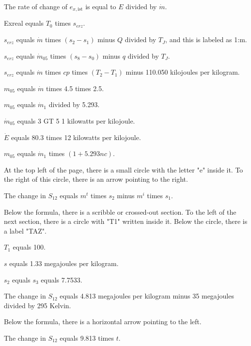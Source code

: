 The rate of change of \( e_{x, \text{ist}} \) is equal to \( E \) divided by \( \dot{m} \).

Exreal equals \( T_0 \) times \( s_{erz} \).

\( s_{erz} \) equals \( \dot{m} \) times \( (s_2 - s_1) \) minus \( Q \) divided by \( T_J \), and this is labeled as 1:m.

\( s_{erz} \) equals \( \dot{m}_{05} \) times \( (s_8 - s_0) \) minus \( q \) divided by \( T_J \).

\( s_{erz} \) equals \( \dot{m} \) times \( cp \) times \( (T_2 - T_1) \) minus 110.050 kilojoules per kilogram.

\( m_{05} \) equals \( \dot{m} \) times 4.5 times 2.5.

\( m_{05} \) equals \( \dot{m}_1 \) divided by 5.293.

\( \dot{m}_{05} \) equals 3 GT 5 1 kilowatts per kilojoule.

\( \dot{E} \) equals 80.3 times 12 kilowatts per kilojoule.

\( m_{05} \) equals \( \dot{m}_1 \) times \( (1 + 5.293 nc) \).

At the top left of the page, there is a small circle with the letter "e" inside it. To the right of this circle, there is an arrow pointing to the right.

The change in \( S_{12} \) equals \( m^t \) times \( s_2 \) minus \( m^i \) times \( s_1 \).

Below the formula, there is a scribble or crossed-out section.
To the left of the next section, there is a circle with "T1" written inside it.
Below the circle, there is a label "TAZ".

\( T_1 \) equals 100.

\( s \) equals 1.33 megajoules per kilogram.

\( s_2 \) equals \( s_3 \) equals 7.7533.

The change in \( S_{12} \) equals 4.813 megajoules per kilogram minus 35 megajoules divided by 295 Kelvin.

Below the formula, there is a horizontal arrow pointing to the left.

The change in \( S_{12} \) equals 9.813 times \( t \).